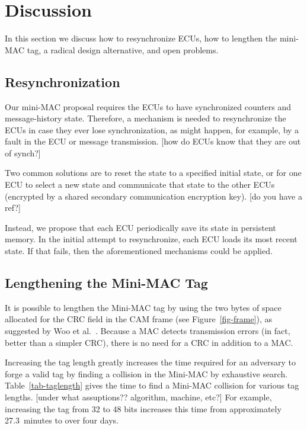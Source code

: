 \section{Discussion}
\label{discuss}

In this section we discuss how to resynchronize ECUs, 
how to lengthen the mini-MAC tag, 
a radical design alternative, 
and open problems.

\subsection{Resynchronization}
\label{resynch}

Our mini-MAC proposal requires the ECUs to have synchronized counters and message-history state.
Therefore, a mechanism is needed to resynchronize the ECUs in case they ever lose synchronization,
as might happen, for example, by a fault in the ECU or message transmission.
[how do ECUs know that they are out of synch?]

Two common solutions are to reset the state to a specified initial state, or for one ECU to select
a new state and communicate that state to the other ECUs (encrypted by a shared secondary communication
encryption key).  [do you have a ref?]

Instead, we propose that each ECU periodically save its state in persistent memory.  In the initial attempt
to resynchronize, each ECU loads its most recent state.  If that fails, then the aforementioned
mechanisms could be applied.


\subsection{Lengthening the Mini-MAC Tag}
\label{addingbits}

It is possible to lengthen the Mini-MAC tag by 
using the two bytes of space allocated for the CRC field in the CAM frame (see Figure~\ref{fig-frame}),
as suggested by Woo et al.~\cite{Woo-14}.
Because a MAC detects transmission errors (in fact, better than a simpler CRC), there is no need for
a CRC in addition to a MAC.  

Increasing the tag length greatly increases the time required for an adversary to forge a valid tag by
finding a collision in the Mini-MAC by exhaustive search.  Table~\ref{tab-taglength} gives the
time to find a Mini-MAC collision for various tag lengths. [under what assuptions?? algorithm, machine, etc?]
For example, increasing the tag from 32 to 48 bits increases this time from
approximately 27.3~minutes to over four days.

